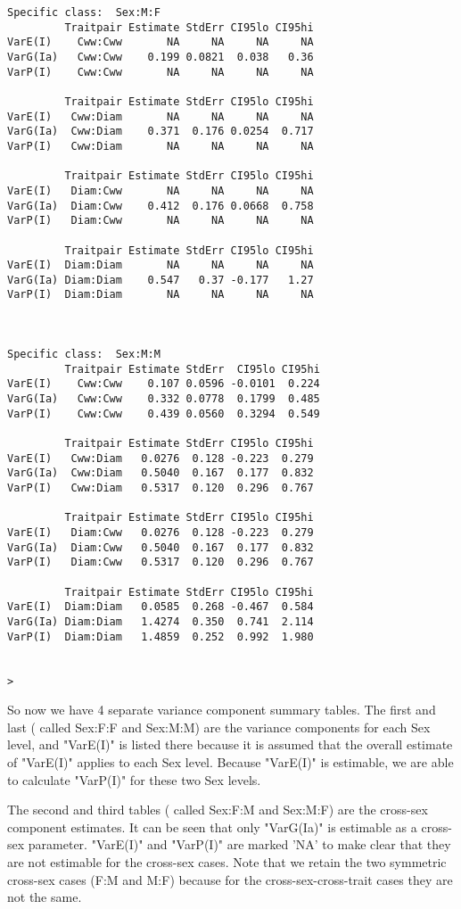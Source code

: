 \documentclass[titlepage]{article}  %
\begin{document}
\begin{verbatim}
Specific class:  Sex:M:F 
         Traitpair Estimate StdErr CI95lo CI95hi
VarE(I)    Cww:Cww       NA     NA     NA     NA
VarG(Ia)   Cww:Cww    0.199 0.0821  0.038   0.36
VarP(I)    Cww:Cww       NA     NA     NA     NA

         Traitpair Estimate StdErr CI95lo CI95hi
VarE(I)   Cww:Diam       NA     NA     NA     NA
VarG(Ia)  Cww:Diam    0.371  0.176 0.0254  0.717
VarP(I)   Cww:Diam       NA     NA     NA     NA

         Traitpair Estimate StdErr CI95lo CI95hi
VarE(I)   Diam:Cww       NA     NA     NA     NA
VarG(Ia)  Diam:Cww    0.412  0.176 0.0668  0.758
VarP(I)   Diam:Cww       NA     NA     NA     NA

         Traitpair Estimate StdErr CI95lo CI95hi
VarE(I)  Diam:Diam       NA     NA     NA     NA
VarG(Ia) Diam:Diam    0.547   0.37 -0.177   1.27
VarP(I)  Diam:Diam       NA     NA     NA     NA



Specific class:  Sex:M:M 
         Traitpair Estimate StdErr  CI95lo CI95hi
VarE(I)    Cww:Cww    0.107 0.0596 -0.0101  0.224
VarG(Ia)   Cww:Cww    0.332 0.0778  0.1799  0.485
VarP(I)    Cww:Cww    0.439 0.0560  0.3294  0.549

         Traitpair Estimate StdErr CI95lo CI95hi
VarE(I)   Cww:Diam   0.0276  0.128 -0.223  0.279
VarG(Ia)  Cww:Diam   0.5040  0.167  0.177  0.832
VarP(I)   Cww:Diam   0.5317  0.120  0.296  0.767

         Traitpair Estimate StdErr CI95lo CI95hi
VarE(I)   Diam:Cww   0.0276  0.128 -0.223  0.279
VarG(Ia)  Diam:Cww   0.5040  0.167  0.177  0.832
VarP(I)   Diam:Cww   0.5317  0.120  0.296  0.767

         Traitpair Estimate StdErr CI95lo CI95hi
VarE(I)  Diam:Diam   0.0585  0.268 -0.467  0.584
VarG(Ia) Diam:Diam   1.4274  0.350  0.741  2.114
VarP(I)  Diam:Diam   1.4859  0.252  0.992  1.980


> 
\end{verbatim} 
 So now we have 4 separate variance component summary tables. The first and last ( called Sex:F:F and Sex:M:M) are the variance components for each Sex level, and "VarE(I)" is listed there because it is assumed that the overall estimate of "VarE(I)" applies to each Sex level. Because "VarE(I)" is estimable, we are able to calculate "VarP(I)" for these two Sex levels. 

The second and third tables ( called Sex:F:M and Sex:M:F) are the cross-sex component estimates. It can be seen that only "VarG(Ia)" is estimable as a cross-sex parameter. "VarE(I)" and "VarP(I)" are marked 'NA' to make clear that they are not estimable for the cross-sex cases. Note that we retain the two symmetric cross-sex cases (F:M and M:F) because for the cross-sex-cross-trait cases they are not the same.
\end{document}
